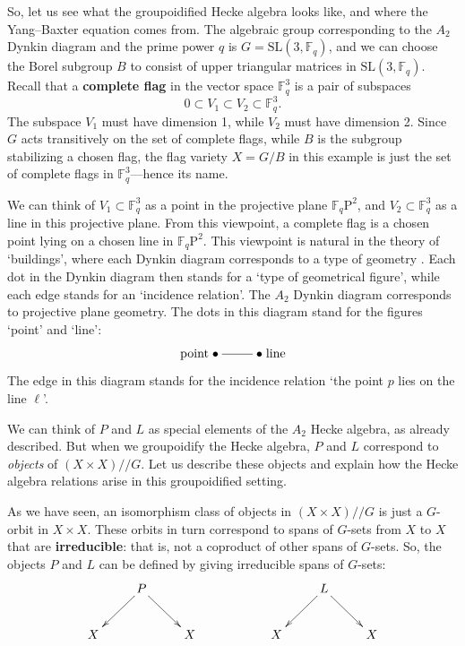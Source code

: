 \documentclass{article}
\newcommand{\SL}{\mathrm{SL}}
\newcommand{\F}{{\mathbb F}}
\newcommand{\Over}{/\!/}
\begin{document}
So, let us see what the groupoidified Hecke algebra looks like, and
where the Yang--Baxter equation comes from.  The algebraic group
corresponding to the $A_2$ Dynkin diagram and the prime power $q$ is
$G = \SL(3,\F_q)$, and we can choose the Borel subgroup $B$ to consist
of upper triangular matrices in $\SL(3,\F_q)$.  Recall that a {\bf
complete flag} in the vector space $\F_q^3$ is a pair of subspaces
\[           0 \subset V_1 \subset V_2 \subset \F_q^3  . \]
The subspace $V_1$ must have dimension 1, while $V_2$ must have
dimension 2.  Since $G$ acts transitively on the set of complete
flags, while $B$ is the subgroup stabilizing a chosen flag, the flag
variety $X = G/B$ in this example is just the set of complete flags in
$\F_q^3$---hence its name.

We can think of $V_1 \subset \F_q^3$ as a point in the projective
plane $\F_q{\mathrm P}^2$, and $V_2 \subset \F_q^3$ as a line in this
projective plane.  From this viewpoint, a complete flag is a chosen
point lying on a chosen line in $\F_q {\mathrm P}^2$.  This viewpoint
is natural in the theory of `buildings', where each Dynkin diagram
corresponds to a type of geometry \cite{Brown,Garrett}.  Each dot in
the Dynkin diagram then stands for a `type of geometrical figure',
while each edge stands for an `incidence relation'.  The $A_2$ Dynkin
diagram corresponds to projective plane geometry.  The dots in this
diagram stand for the figures `point' and `line':
\[\xymatrix{ {\rm point} \; \bullet \ar@{-}[r] & 
\bullet \; {\rm line} }\] 
The edge in this diagram stands for the incidence
relation `the point $p$ lies on the line $\ell$'.  

We can think of $P$ and $L$ as special elements of the $A_2$ Hecke
algebra, as already described.  But when we groupoidify the Hecke
algebra, $P$ and $L$ correspond to {\it objects} of $(X \times X)\Over
G$.  Let us describe these objects and explain how the Hecke algebra
relations arise in this groupoidified setting.

As we have seen, an isomorphism class of objects in $(X \times X)\Over
G$ is just a $G$-orbit in $X \times X$.  These orbits in turn
correspond to spans of $G$-sets from $X$ to $X$ that are {\bf
irreducible}: that is, not a coproduct of other spans of $G$-sets.
So, the objects $P$ and $L$ can be defined by giving irreducible spans
of $G$-sets:
\[
\xymatrix{
    & P \ar[dl]\ar[dr] &    &&     & L\ar[dl]\ar[dr] & \\
X &                  &X && X &                 &X
}
\]
\end{document}

